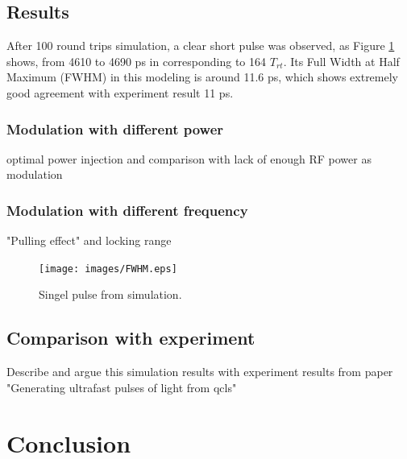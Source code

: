 \documentclass[11pt,final]{scrbook}
\begin{document}
\section{Results}
After 100 round trips simulation, a clear short pulse was observed, as Figure \ref{fig:FWHM} shows, from 4610 to 4690 ps in corresponding to 164 $T_{rt}$. Its Full Width at Half Maximum (FWHM) in this modeling is around 11.6 ps, which shows extremely good agreement with experiment result 11 ps\cite{gellie2010injection}.

\subsection{Modulation with different power} 
optimal power injection and comparison with lack of enough RF power as modulation
\subsection{Modulation with different frequency} 
"Pulling effect" and locking range

\begin{figure}[htbp]
\begin{center}
\texttt{[image: images/FWHM.eps]}
\caption{Singel pulse from simulation.}
\label{fig:FWHM}
\end{center}
\end{figure}

\section{Comparison with experiment}
Describe and argue this simulation results with experiment results from paper "Generating ultrafast pulses of light from qcls"
\chapter{Conclusion}





\renewcommand*{\bibname}{Bibliography} %
{}


\end{document}
